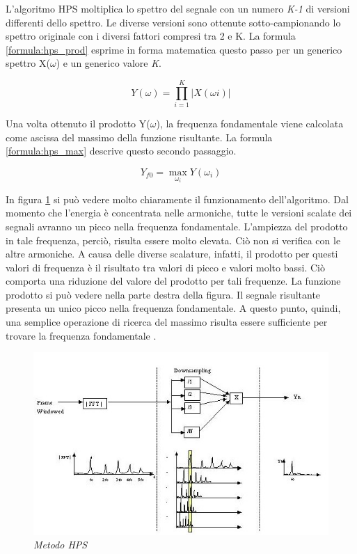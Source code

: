 	L'algoritmo HPS moltiplica lo spettro del segnale con un numero \emph{K-1} di versioni differenti dello spettro.
	Le diverse versioni sono ottenute sotto-campionando lo spettro originale con i diversi fattori compresi tra 2 e K.
	La formula \ref{formula:hps_prod} esprime in forma matematica questo passo per un generico spettro X($\omega$) e un generico valore \emph{K}.

		\begin{equation}\label{formula:hps_prod}
			Y(\omega) = \prod_{i=1}^K \left | X(\omega i) \right |
		\end{equation}

	Una volta ottenuto il prodotto Y($\omega$), la frequenza fondamentale viene calcolata come ascissa del massimo della funzione risultante. 
	La formula \ref{formula:hps_max} descrive questo secondo passaggio.

		\begin{equation}\label{formula:hps_max}
			Y_{f0} = \max_{\omega_i} Y \left(\omega_i \right )
		\end{equation}

	In figura \ref{fig:HPS} si può vedere molto chiaramente il funzionamento dell'algoritmo. 
	Dal momento che l'energia è concentrata nelle armoniche, tutte le versioni scalate dei segnali avranno un picco nella frequenza fondamentale. 
	L'ampiezza del prodotto in tale frequenza, perciò, risulta essere molto elevata.
	Ciò non si verifica con le altre armoniche.
	A causa delle diverse scalature, infatti, il prodotto per questi valori di frequenza è il risultato tra valori di picco e valori molto bassi.
	Ciò comporta una riduzione del valore del prodotto per tali frequenze. 
	La funzione prodotto si può vedere nella parte destra della figura. 
	Il segnale risultante presenta un unico picco nella frequenza fondamentale.
	A questo punto, quindi, una semplice operazione di ricerca del massimo risulta essere sufficiente per trovare la frequenza fondamentale \cite{Cuadra01efficientpitch}.

		\begin{figure}[h]
		  \begin{center} 
		    \includegraphics[width=\textwidth*\real{0.68}]{images/ch_04/processo.jpg}
		  \end{center} 
		  \caption{\textit{Metodo HPS}}  
		  \label{fig:HPS}
		\end{figure}

